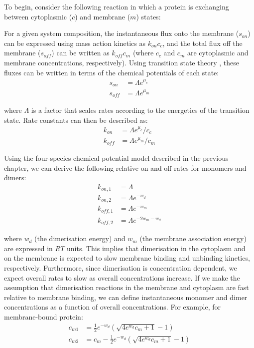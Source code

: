 \documentclass[12pt]{"report"}
\begin{document}
To begin, consider the following reaction in which a protein is exchanging between cytoplasmic ($c$) and membrane ($m$) states: 
\begin{center}
\end{center}

For a given system composition, the instantaneous flux onto the membrane ($s_{on}$) can be expressed using mass action kinetics as $k_{on} c_c$, and the total flux off the membrane ($s_{off}$) can be written as $k_{off} c_m$ (where $c_c$ and $c_m$ are cytoplasmic and membrane concentrations, respectively). Using transition state theory \citep{Hanggi1990}, these fluxes can be written in terms of the chemical potentials of each state:
\begin{align}
s_{on} &= \Lambda e^{\mu_c}\\
s_{off} &= \Lambda e^{\mu_m}
\end{align}

where $\Lambda$ is a factor that scales rates according to the energetics of the transition state. Rate constants can then be described as:
\begin{align}
k_{on} &= \Lambda e^{\mu_c} / c_c \\
k_{off} &= \Lambda e^{\mu_m} / c_m
\end{align}

Using the four-species chemical potential model described in the previous chapter, we can derive the following relative on and off rates for monomers and dimers:
\begin{align}
k_{on,1} &= \Lambda\\
k_{on,2} &= \Lambda e^{-w_d}\\
k_{off,1} &= \Lambda e^{-w_m}\\
k_{off,2} &= \Lambda e^{-2w_m - w_d}
\end{align}

where $w_d$ (the dimerisation energy) and $w_m$ (the membrane association energy) are expressed in $RT$ units. This implies that dimerisation in the cytoplasm and on the membrane is expected to slow membrane binding and unbinding kinetics, respectively. Furthermore, since dimerisation is concentration dependent, we expect overall rates to slow as overall concentrations increase. If we make the assumption that dimerisation reactions in the membrane and cytoplasm are fast relative to membrane binding, we can define instantaneous monomer and dimer concentrations as a function of overall concentrations. For example, for membrane-bound protein:
\begin{align}
c_{m1} &= \frac{1}{2} e^{-w_d} \left(\sqrt{4e^{w_d} c_m + 1} - 1\right)\\
c_{m2} &= c_m - \frac{1}{2}e^{-w_d}\left(\sqrt{4e^{w_d} c_m + 1} - 1\right)
\end{align}
\end{document}
